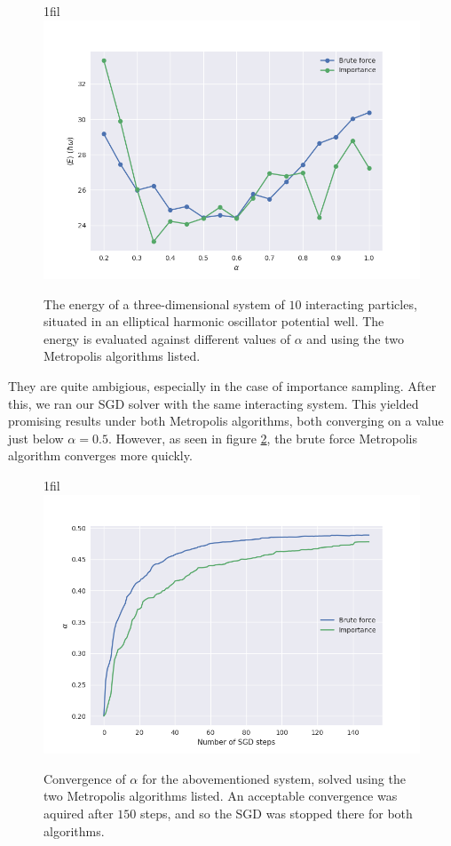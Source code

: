 \documentclass[
]{article}
\makeatletter
\newcommand*{\centerfloat}{%
  \parindent \z@
  \leftskip \z@ \@plus 1fil \@minus \textwidth
  \rightskip\leftskip
  \parfillskip \z@skip}
\makeatother
\begin{document}
\begin{figure}[htb]
  \centerfloat
  \includegraphics[scale=.5]{assets/plots/interacting_elliptical.png}
  \caption{The energy of a three-dimensional system of $10$ interacting particles, situated in an elliptical harmonic oscillator potential well. The energy is evaluated against different values of $\alpha$ and using the two Metropolis algorithms listed.}
  \label{fig:interacting-elliptical}
\end{figure}

They are quite ambigious, especially in the case of importance sampling.
After this, we ran our SGD solver with the same interacting system. This
yielded promising results under both Metropolis algorithms, both
converging on a value just below \(\alpha = 0.5\). However, as seen in
figure \ref{fig:sgd-interacting}, the brute force Metropolis algorithm
converges more quickly.

\begin{figure}[htb]
  \centerfloat
  \includegraphics[scale=.5]{assets/plots/sgd_interacting.png}
  \caption{Convergence of $\alpha$ for the abovementioned system, solved using the two Metropolis algorithms listed. An acceptable convergence was aquired after $150$ steps, and so the SGD was stopped there for both algorithms.}
  \label{fig:sgd-interacting}
\end{figure}
\FloatBarrier
\end{document}
